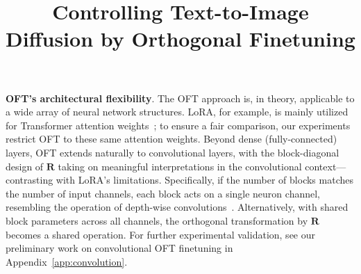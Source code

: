 \title{Controlling Text-to-Image Diffusion by Orthogonal Finetuning}
\textbf{OFT’s architectural flexibility}. The OFT approach is, in theory, applicable to a wide array of neural network structures. LoRA, for example, is mainly utilized for Transformer attention weights~\cite{hulora2022}; to ensure a fair comparison, our experiments restrict OFT to these same attention weights. Beyond dense (fully-connected) layers, OFT extends naturally to convolutional layers, with the block-diagonal design of $\bm{R}$ taking on meaningful interpretations in the convolutional context—contrasting with LoRA's limitations. Specifically, if the number of blocks matches the number of input channels, each block acts on a single neuron channel, resembling the operation of depth-wise convolutions~\cite{chollet2017xception}. Alternatively, with shared block parameters across all channels, the orthogonal transformation by $\bm{R}$ becomes a shared operation. For further experimental validation, see our preliminary work on convolutional OFT finetuning in Appendix~\ref{app:convolution}.

